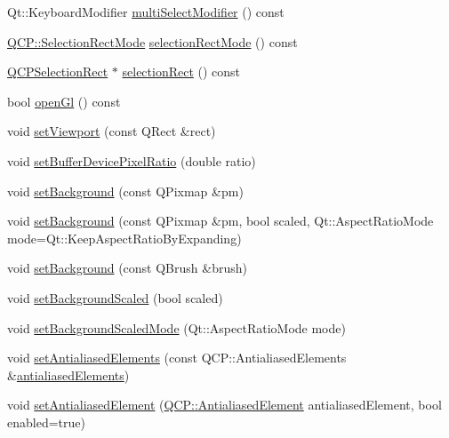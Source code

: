 \begin{DoxyCompactItemize}
\item 
Qt\+::\+Keyboard\+Modifier \hyperlink{class_q_custom_plot_a9b6b1a0fea8da3fda6d5e3d687202877}{multi\+Select\+Modifier} () const 
\item 
\hyperlink{namespace_q_c_p_ac9aa4d6d81ac76b094f9af9ad2d3aacf}{Q\+C\+P\+::\+Selection\+Rect\+Mode} \hyperlink{class_q_custom_plot_afae2023152cd30e7052b536148226a04}{selection\+Rect\+Mode} () const 
\item 
\hyperlink{class_q_c_p_selection_rect}{Q\+C\+P\+Selection\+Rect} $\ast$ \hyperlink{class_q_custom_plot_ae64a3994735d8f592a60d9430526a163}{selection\+Rect} () const 
\item 
bool \hyperlink{class_q_custom_plot_ab81fd5b380574c6dee92b6d8c8fd1b18}{open\+Gl} () const 
\item 
void \hyperlink{class_q_custom_plot_a3f9bc4b939dd8aaba9339fd09f273fc4}{set\+Viewport} (const Q\+Rect \&rect)
\item 
void \hyperlink{class_q_custom_plot_a159162653ad6f8b8bf21263ba5787215}{set\+Buffer\+Device\+Pixel\+Ratio} (double ratio)
\item 
void \hyperlink{class_q_custom_plot_a130358592cfca353ff3cf5571b49fb00}{set\+Background} (const Q\+Pixmap \&pm)
\item 
void \hyperlink{class_q_custom_plot_a8513971d6aa24d8b0d6a68d45b542130}{set\+Background} (const Q\+Pixmap \&pm, bool scaled, Qt\+::\+Aspect\+Ratio\+Mode mode=Qt\+::\+Keep\+Aspect\+Ratio\+By\+Expanding)
\item 
void \hyperlink{class_q_custom_plot_a8ed256cf467bfa7ba1f9feaae62c3bd0}{set\+Background} (const Q\+Brush \&brush)
\item 
void \hyperlink{class_q_custom_plot_a36f0fa1317325dc7b7efea615ee2de1f}{set\+Background\+Scaled} (bool scaled)
\item 
void \hyperlink{class_q_custom_plot_a4c0eb4865b7949f62e1cb97db04a3de0}{set\+Background\+Scaled\+Mode} (Qt\+::\+Aspect\+Ratio\+Mode mode)
\item 
void \hyperlink{class_q_custom_plot_af6f91e5eab1be85f67c556e98c3745e8}{set\+Antialiased\+Elements} (const Q\+C\+P\+::\+Antialiased\+Elements \&\hyperlink{class_q_custom_plot_a81e954fbb485bb44c609e5707f0067b3}{antialiased\+Elements})
\item 
void \hyperlink{class_q_custom_plot_aeef813bcf7efab8e765f9f87ec454691}{set\+Antialiased\+Element} (\hyperlink{namespace_q_c_p_ae55dbe315d41fe80f29ba88100843a0c}{Q\+C\+P\+::\+Antialiased\+Element} antialiased\+Element, bool enabled=true)
\item 

\end{DoxyCompactItemize}
